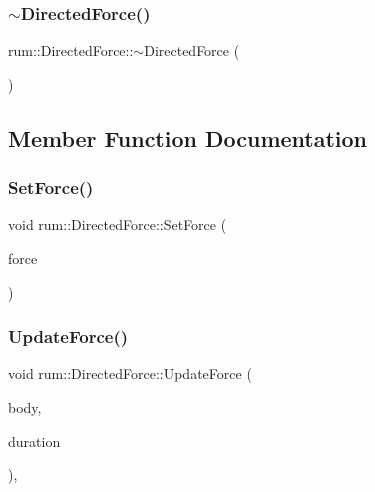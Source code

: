 \subsubsection{\texorpdfstring{$\sim$\+Directed\+Force()}{~DirectedForce()}}
{\footnotesize\ttfamily rum\+::\+Directed\+Force\+::$\sim$\+Directed\+Force (\begin{DoxyParamCaption}{ }\end{DoxyParamCaption})}



\subsection{Member Function Documentation}
\mbox{\label{classrum_1_1_directed_force_ae632c56c26193e81ff71501dab5b8e04}} 
\subsubsection{\texorpdfstring{Set\+Force()}{SetForce()}}
{\footnotesize\ttfamily void rum\+::\+Directed\+Force\+::\+Set\+Force (\begin{DoxyParamCaption}\item[{const glm\+::vec3 \&}]{force }\end{DoxyParamCaption})}

\mbox{\label{classrum_1_1_directed_force_a79b53d849f80fb69ca1fa42ea43829b4}} 
\subsubsection{\texorpdfstring{Update\+Force()}{UpdateForce()}}
{\footnotesize\ttfamily void rum\+::\+Directed\+Force\+::\+Update\+Force (\begin{DoxyParamCaption}\item[{\hyperlink{classrum_1_1_rigid_body}{Rigid\+Body} $\ast$}]{body,  }\item[{\hyperlink{namespacerum_a7e8cca23573d5eaead0f138cbaa4862c}{real}}]{duration }\end{DoxyParamCaption})\hspace{0.3cm}{\ttfamily [override]}, {\ttfamily [virtual]}}



